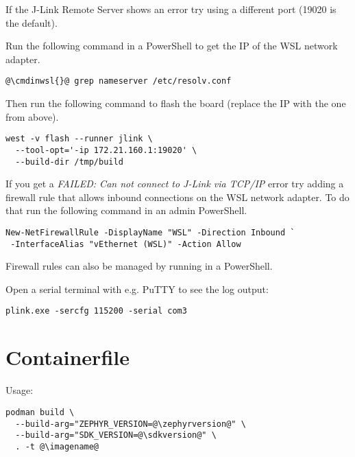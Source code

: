 \begin{infobox}
  If the J-Link Remote Server shows an error try using a different port
  (19020 is the default).
\end{infobox}

Run the following command in a PowerShell to get the IP of the WSL network
adapter.

\begin{lstlisting}
@\cmdinwsl{}@ grep nameserver /etc/resolv.conf
\end{lstlisting}

Then run the following command to flash the board (replace the IP with the one
from above).

\begin{lstlisting}
west -v flash --runner jlink \
  --tool-opt='-ip 172.21.160.1:19020' \
  --build-dir /tmp/build
\end{lstlisting}

\begin{infobox}
  If you get a \emph{FAILED: Can not connect to J-Link via TCP/IP} error try
  adding a firewall rule that allows inbound connections on the WSL network
  adapter. To do that run the following command in an admin PowerShell.

  \begin{lstlisting}
New-NetFirewallRule -DisplayName "WSL" -Direction Inbound `
 -InterfaceAlias "vEthernet (WSL)" -Action Allow
\end{lstlisting}

  Firewall rules can also be managed by running  in a PowerShell.
\end{infobox}

Open a serial terminal with e.g. PuTTY to see the log output:

\begin{lstlisting}
plink.exe -sercfg 115200 -serial com3
\end{lstlisting}

\newpage

\fancyfoot{}

\appendix

\section{Containerfile}\label{containerfile}



Usage:

\begin{lstlisting}
podman build \
  --build-arg="ZEPHYR_VERSION=@\zephyrversion@" \
  --build-arg="SDK_VERSION=@\sdkversion@" \
  . -t @\imagename@
\end{lstlisting}




